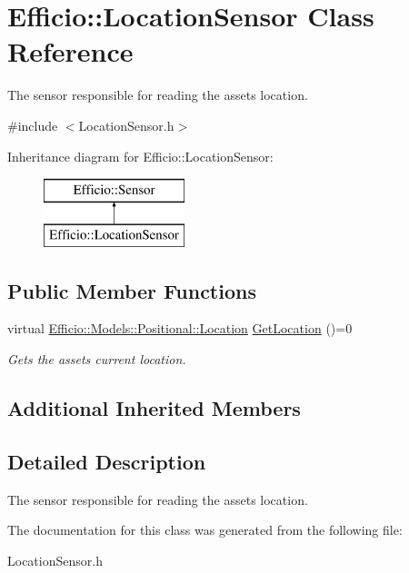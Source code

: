 \hypertarget{class_efficio_1_1_location_sensor}{}\section{Efficio\+:\+:Location\+Sensor Class Reference}
\label{class_efficio_1_1_location_sensor}


The sensor responsible for reading the asset\textquotesingle{}s location.  




{\ttfamily \#include $<$Location\+Sensor.\+h$>$}

Inheritance diagram for Efficio\+:\+:Location\+Sensor\+:\begin{figure}[H]
\begin{center}
\leavevmode
\includegraphics[height=2.000000cm]{class_efficio_1_1_location_sensor}
\end{center}
\end{figure}
\subsection*{Public Member Functions}
\begin{DoxyCompactItemize}
\item 
virtual \hyperlink{class_efficio_1_1_models_1_1_positional_1_1_location}{Efficio\+::\+Models\+::\+Positional\+::\+Location} \hyperlink{class_efficio_1_1_location_sensor_a5d362c6b12afc369b388bcd6fdefc792}{Get\+Location} ()=0\hypertarget{class_efficio_1_1_location_sensor_a5d362c6b12afc369b388bcd6fdefc792}{}\label{class_efficio_1_1_location_sensor_a5d362c6b12afc369b388bcd6fdefc792}

\begin{DoxyCompactList}\small\item\em Gets the asset\textquotesingle{}s current location. \end{DoxyCompactList}\end{DoxyCompactItemize}
\subsection*{Additional Inherited Members}


\subsection{Detailed Description}
The sensor responsible for reading the asset\textquotesingle{}s location. 

The documentation for this class was generated from the following file\+:\begin{DoxyCompactItemize}
\item 
Location\+Sensor.\+h\end{DoxyCompactItemize}
